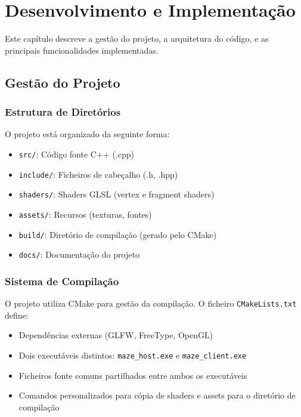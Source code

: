 \chapter{Desenvolvimento e Implementação} \label{chap:implementacao}

Este capítulo descreve a gestão do projeto, a arquitetura do código, e as principais funcionalidades implementadas.

\section{Gestão do Projeto} \label{sec:impl_gestao}

\subsection{Estrutura de Diretórios}
O projeto está organizado da seguinte forma:

\begin{itemize}
    \item \texttt{src/}: Código fonte C++ (.cpp)
    \item \texttt{include/}: Ficheiros de cabeçalho (.h, .hpp)
    \item \texttt{shaders/}: Shaders GLSL (vertex e fragment shaders)
    \item \texttt{assets/}: Recursos (texturas, fontes)
    \item \texttt{build/}: Diretório de compilação (gerado pelo CMake)
    \item \texttt{docs/}: Documentação do projeto
\end{itemize}

\subsection{Sistema de Compilação}
O projeto utiliza CMake para gestão da compilação. O ficheiro \texttt{CMakeLists.txt} define:

\begin{itemize}
    \item Dependências externas (GLFW, FreeType, OpenGL)
    \item Dois executáveis distintos: \texttt{maze\_host.exe} e \texttt{maze\_client.exe}
    \item Ficheiros fonte comuns partilhados entre ambos os executáveis
    \item Comandos personalizados para cópia de shaders e assets para o diretório de compilação
\end{itemize}

